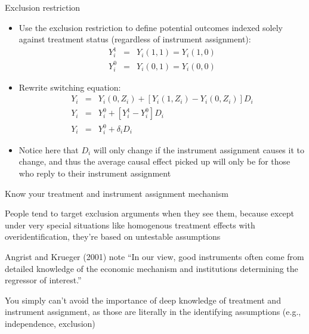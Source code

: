 \documentclass{beamer}
\begin{document}
\begin{frame}{Exclusion restriction}
	
	\begin{itemize}
	\item Use the exclusion restriction to define potential outcomes indexed solely against treatment status (regardless of instrument assignment): 
		\begin{eqnarray*}
		 Y^1_{i} &=& Y_i(1,1) = Y_i(1,0) \\
		 Y^0_{i} &=& Y_i(0,1) = Y_i(0,0)
		\end{eqnarray*}
	\item Rewrite switching equation:
		\begin{eqnarray*}
		Y_i &=& Y_i(0,Z_i) + [Y_i(1,Z_i) - Y_i(0,Z_i)]D_i \\
		Y_i &=& Y^0_{i} + [Y^1_{i} - Y^0_{i}]D_i \\
		Y_i &=& Y^0_i + \delta_iD_i
		\end{eqnarray*}
	\item Notice here that $D_i$ will only change if the instrument assignment causes it to change, and thus the average causal effect picked up will only be for those who reply to their instrument assignment
	\end{itemize}

\end{frame}

\begin{frame}{Know your treatment and instrument assignment mechanism}

People tend to target exclusion arguments when they see them, because except under very special situations like homogenous treatment effects with overidentification, they're based on untestable assumptions

\bigskip

Angrist and Krueger (2001) note ``In our view, good instruments often come from detailed knowledge of the economic mechanism and institutions determining the regressor of interest.''  

\bigskip

You simply can't avoid the importance of deep knowledge of treatment and instrument assignment, as those are literally in the identifying assumptions (e.g., independence, exclusion)

\end{frame}
\end{document}
